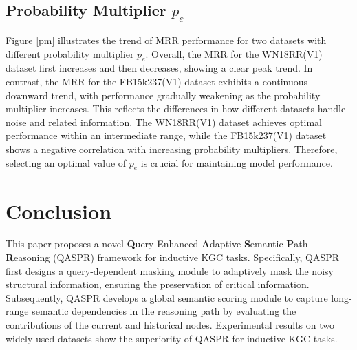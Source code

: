 \documentclass[sigconf]{acmart}
\begin{document}
\subsection{Probability Multiplier $p_{e}$}
Figure \ref{pm} illustrates the trend of MRR performance for two datasets with different probability multiplier $p_e$. Overall, the MRR for the WN18RR(V1) dataset first increases and then decreases, showing a clear peak trend. In contrast, the MRR for the FB15k237(V1) dataset exhibits a continuous downward trend, with performance gradually weakening as the probability multiplier increases. This reflects the differences in how different datasets handle noise and related information. The WN18RR(V1) dataset achieves optimal performance within an intermediate range, while the FB15k237(V1) dataset shows a negative correlation with increasing probability multipliers. Therefore, selecting an optimal value of $p_e$ is crucial for maintaining model performance.

\section{Conclusion}\label{Sec:CONCLUSION}
This paper proposes a novel \textbf{Q}uery-Enhanced \textbf{A}daptive \textbf{S}emantic \textbf{P}ath \textbf{R}easoning (QASPR) framework for inductive KGC tasks. Specifically, QASPR first designs a query-dependent masking module to adaptively mask the noisy structural information, ensuring the preservation of critical information. Subsequently, QASPR develops a global semantic scoring module to capture long-range semantic dependencies in the reasoning path by evaluating the contributions of the current and historical nodes. Experimental results on two widely used datasets show the superiority of QASPR for inductive KGC tasks. 


%
%
%
\end{document}

